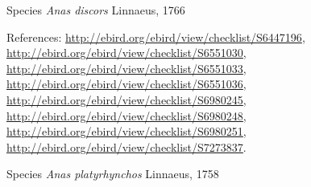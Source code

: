 \documentclass[9pt, article]{memoir}
\begin{document}
\begin{multicols}{2}
\vspace{6pt}\noindent\hspace{36pt}Species \textit{Anas discors} Linnaeus, 1766


\vspace{6pt}References: 
\url{http://ebird.org/ebird/view/checklist/S6447196}, 
\url{http://ebird.org/ebird/view/checklist/S6551030}, 
\url{http://ebird.org/ebird/view/checklist/S6551033}, 
\url{http://ebird.org/ebird/view/checklist/S6551036}, 
\url{http://ebird.org/ebird/view/checklist/S6980245}, 
\url{http://ebird.org/ebird/view/checklist/S6980248}, 
\url{http://ebird.org/ebird/view/checklist/S6980251}, 
\url{http://ebird.org/ebird/view/checklist/S7273837}.

\vspace{6pt}\noindent\hspace{36pt}Species \textit{Anas platyrhynchos} Linnaeus, 1758



\end{multicols}
\end{document}

